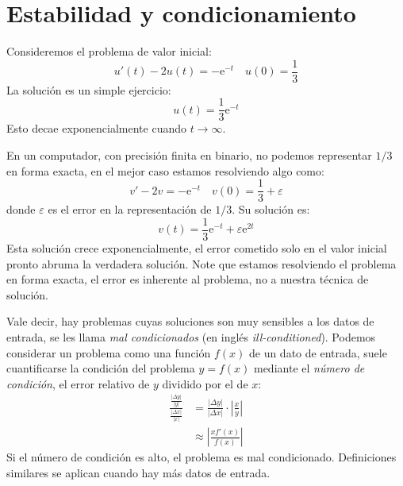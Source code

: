 \section{Estabilidad y condicionamiento}
\label{sec:estabilidad-condicionamiento}

  Consideremos el problema de valor inicial:
  \begin{equation*}
    u'(t) - 2 u(t)
      = - \mathrm{e}^{-t}
      \quad u(0) = \frac{1}{3}
  \end{equation*}
  La solución es un simple ejercicio:
  \begin{equation*}
    u(t)
      = \frac{1}{3} \mathrm{e}^{-t}
  \end{equation*}
  Esto decae exponencialmente cuando \(t \to \infty\).

  En un computador,
  con precisión finita en binario,
  no podemos representar \(1/3\) en forma exacta,
  en el mejor caso estamos resolviendo algo como:
  \begin{equation*}
    v' - 2 v
      = - \mathrm{e}^{-t}
      \quad v(0) = \frac{1}{3} + \varepsilon
  \end{equation*}
  donde \(\varepsilon\) es el error en la representación de \(1/3\).
  Su solución es:
  \begin{equation*}
    v(t)
      = \frac{1}{3} \mathrm{e}^{-t} + \varepsilon \mathrm{e}^{2 t}
  \end{equation*}
  Esta solución crece exponencialmente,
  el error cometido solo en el valor inicial
  pronto abruma la verdadera solución.
  Note que estamos resolviendo el problema en forma exacta,
  el error es inherente al problema,
  no a nuestra técnica de solución.

  Vale decir,
  hay problemas cuyas soluciones son muy sensibles a los datos de entrada,
  se les llama \emph{mal condicionados}
  (en inglés \emph{\foreignlanguage{english}{ill-conditioned}}).
  Podemos considerar un problema como una función \(f(x)\)
  de un dato de entrada,
  suele cuantificarse la condición del problema \(y = f(x)\) mediante
  el \emph{número de condición},
  el error relativo de \(y\) dividido por el de \(x\):
  \begin{align*}
    \frac{\frac{\lvert \Delta y \rvert}{\lvert y \rvert}}
         {\frac{\lvert \Delta x \rvert}{\lvert x \rvert}}
      &=       \frac{\lvert \Delta y \rvert}{\lvert \Delta x \rvert}
                 \cdot \left\lvert \frac{x}{y} \right\rvert \\
      &\approx \left\lvert \frac{x f'(x)}{f(x)} \right\rvert
  \end{align*}
  Si el número de condición es alto,
  el problema es mal condicionado.
  Definiciones similares se aplican cuando hay más datos de entrada.

